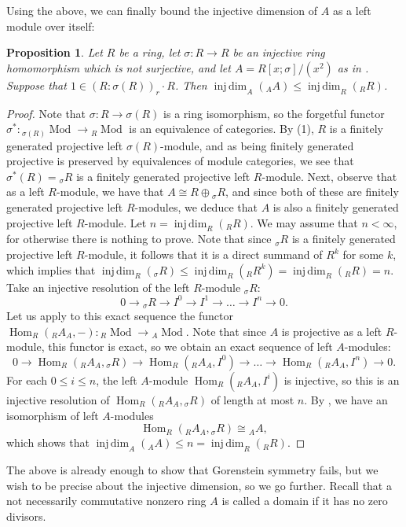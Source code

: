 \documentclass{amsart}
\newtheorem{prop}[equation]{Proposition}
\theoremstyle{definition}
\newcommand{\opn}{\operatorname}
\newcommand{\injdim}{\operatorname{inj\,dim}}
\numberwithin{equation}{section}
\begin{document}
Using the above, we can finally bound the injective dimension of $A$ as a left module over itself:

\begin{prop}\label{prop:injdimleft}
Let $R$ be a ring, let $\sigma:R \to R$ be an injective ring homomorphism which is not surjective,
and let $A = R[x;\sigma]/(x^2)$ as in .
Suppose that 
$1 \in (R:\sigma(R))_r\cdot R$.
Then $\injdim_A({}_A A) \le \injdim_R({}_R R)$.
\end{prop}
\begin{proof}
Note that $\sigma:R \to \sigma(R)$ is a ring isomorphism,
so the forgetful functor $\sigma^*:{}_{\sigma(R)}\opn{Mod} \to {}_R\opn{Mod}$ is an equivalence of categories. 
By (1), $R$ is a finitely generated projective left $\sigma(R)$-module,
and as being finitely generated projective is preserved by equivalences of module categories, we see that $\sigma^*(R) = {}_\sigma R$ is a finitely generated projective left $R$-module.
Next, observe that as a left $R$-module,
we have that $A \cong R \oplus {}_\sigma R$,
and since both of these are finitely generated projective left $R$-modules,
we deduce that $A$ is also a finitely generated projective left $R$-module.
Let $ n = \injdim_R ({}_R R)$.
We may assume that $n<\infty$, 
for otherwise there is nothing to prove.
Note that since ${}_{\sigma} R$ is a finitely generated projective left $R$-module,
it follows that it is a direct summand of $R^k$ for some $k$,
which implies that $\injdim_R({}_\sigma R) \le \injdim_R({}_R R^k) = \injdim_R({}_R R) = n$.
Take an injective resolution of the left $R$-module ${}_{\sigma} R$:
\[
0 \to {}_{\sigma} R \to I^0 \to I^1 \to \dots \to I^n \to 0.
\]
Let us apply to this exact sequence the functor $\opn{Hom}_R({}_R A_A,-) :{}_R\opn{Mod} \to {}_A \opn{Mod}$. Note that since $A$ is projective as a left $R$-module, this functor is exact, 
so we obtain an exact sequence of left $A$-modules:
\[
0 \to \opn{Hom}_R({}_R A_A,{}_{\sigma} R) \to \opn{Hom}_R({}_R A_A,I^0)  \to \dots \to \opn{Hom}_R({}_R A_A,I^n) \to 0.
\]
For each $0 \le i \le n$,
the left $A$-module $\opn{Hom}_R({}_R A_A,I^i)$ is injective,
so this is an injective resolution of $\opn{Hom}_R({}_R A_A,{}_{\sigma} R)$ of length at most $n$.
By ,
we have an isomorphism of left $A$-modules
\[
 \opn{Hom}_R({}_R A_A,{}_{\sigma} R) \cong {}_A A,
\]
which shows that $\injdim_A({}_A A) \le n = \injdim_R({}_R R)$.
\end{proof}

The above is already enough to show that Gorenstein symmetry fails, 
but we wish to be precise about the injective dimension, 
so we go further. Recall that a not necessarily commutative nonzero ring $A$ is called a domain if it has no zero divisors.
\end{document}

